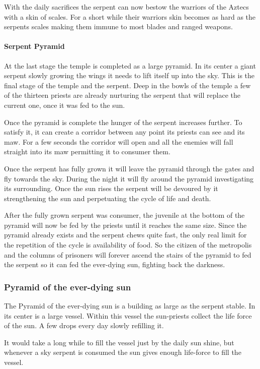 With the daily sacrifices the serpent can now bestow the warriors of the
\gls{Aztecs} with a skin of scales. For a short while their warriors skin
becomes as hard as the serpents scales making them immune to most blades and
ranged weapons.

\paragraph{Serpent Pyramid}
At the last stage the temple is completed as a large pyramid. In its center a
giant serpent slowly growing the wings it needs to lift itself up into the sky.
This is the final stage of the temple and the serpent. Deep in the bowls of the
temple a few of the thirteen priests are already nurturing the serpent that
will replace the current one, once it was fed to the sun.

Once the pyramid is complete the hunger of the serpent increases further. To
satisfy it, it can create a corridor between any point its priests can see and
its maw. For a few seconds the corridor will open and all the enemies will fall
straight into its maw permitting it to consumer them.

Once the serpent has fully grown it will leave the pyramid through the gates
and fly towards the sky. During the night it will fly around the pyramid
investigating its surrounding. Once the sun rises the serpent will be devoured
by it strengthening the sun and perpetuating the cycle of life and death.

After the fully grown serpent was consumer, the juvenile at the bottom of the
pyramid will now be fed by the priests until it reaches the same size. Since
the pyramid already exists and the serpent chews quite fast, the only real
limit for the repetition of the cycle is availability of food. So the citizen
of the metropolis and the columns of prisoners will forever ascend the stairs
of the pyramid to fed the serpent so it can fed the ever-dying sun, fighting
back the darkness.

\subsubsection{Pyramid of the ever-dying sun}
The Pyramid of the ever-dying sun is a building as large as the serpent stable.
In its center is a large vessel. Within this vessel the sun-priests collect the
life force of the sun. A few drops every day slowly refilling it.

It would take a long while to fill the vessel just by the daily sun shine, but
whenever a sky serpent is consumed the sun gives enough life-force to fill the
vessel.

